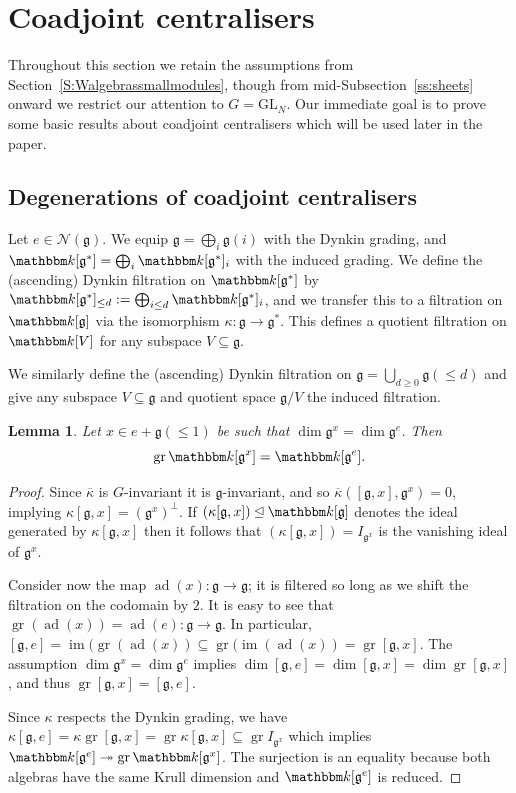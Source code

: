 \documentclass[twoside,12pt,reqno]{amsart}
\newtheorem{Lemma}[Theorem]{Lemma}
\theoremstyle{remark}
\numberwithin{equation}{section}
\def\bar{\overline}
\def\onto{\twoheadrightarrow}
\def\k{{\mathbbm k}}
\def\ad{\operatorname{ad}}
\def\gr{\operatorname{gr}}
\def\im{\operatorname{im}}
\def\GL{\mathrm{GL}}
\def\g{{\mathfrak g}}
\newcommand{\Nc}{\mathcal{N}}
\begin{document}
\section{Coadjoint centralisers}\label{s:centralisers}

Throughout this section we retain the assumptions from Section~\ref{S:Walgebrassmallmodules}, though from mid-Subsection~\ref{ss:sheets} onward we restrict our attention to $G=\GL_N$. Our immediate goal is to prove some basic results about coadjoint centralisers which will be used later in the paper.

\subsection{Degenerations of coadjoint centralisers}
Let $e\in \Nc(\g)$. We equip $\g = \bigoplus_i \g(i)$ with the Dynkin grading, and $\k[\g^*] = \bigoplus_i \k[\g^*]_i$ with the induced grading. We define the (ascending) Dynkin filtration on $\k[\g^*]$ by $\k[\g^*]_{\le d} := \bigoplus_{i\le d} \k[\g^*]_i$, and we transfer this to a filtration on $\k[\g]$ via the isomorphism $\kappa : \g \to \g^*$. This defines a quotient filtration on $\k[V]$ for any subspace $V \subseteq \g$.

We similarly define the (ascending) Dynkin filtration on $\g = \bigcup_{d\ge 0} \g(\le d)$ and give any subspace $V\subseteq \g$ and quotient space $\g/V$ the induced filtration.

\begin{Lemma}
\label{L:Liealgebracentraliserdegenerations}
    Let $x\in e + \g(\le 1)$ be such that $\dim \g^x = \dim \g^e$.
    Then $$\gr \k[\g^x] = \k[\g^e].$$
\end{Lemma}
\begin{proof}

    Since $\bar\kappa$ is $G$-invariant it is $\g$-invariant, and so $\bar\kappa([\g,x], \g^x) = 0$, implying $\kappa[\g,x] = (\g^x)^\perp$. If $(\kappa[\g,x]) \unlhd \k[\g]$ denotes the ideal generated by $\kappa[\g,x]$ then it follows that $(\kappa[\g,x]) = I_{\g^x}$ is the vanishing ideal of $\g^x$.

    Consider now the map $\ad(x):\g\to\g$; it is filtered so long as we shift the filtration on the codomain by $2$. It is easy to see that $\gr(\ad(x))=\ad(e):\g\to\g$. In particular, $[\g,e]=\im(\gr(\ad(x))\subseteq \gr(\im(\ad(x))=\gr[\g,x]$. The assumption $\dim\g^x=\dim\g^e$ implies $\dim[\g,e]=\dim[\g,x]=\dim\gr[\g,x]$, and thus $\gr[\g,x]=[\g,e]$.

    Since $\kappa$ respects the Dynkin grading, we have $\kappa[\g,e] = \kappa\gr [\g,x] = \gr \kappa [\g,x] \subseteq \gr I_{\g^x}$ which implies $\k[\g^e] \onto \gr \k[\g^x]$. The surjection is an equality because both algebras have the same Krull dimension and $\k[\g^e]$ is reduced.
\end{proof}
\end{document}
